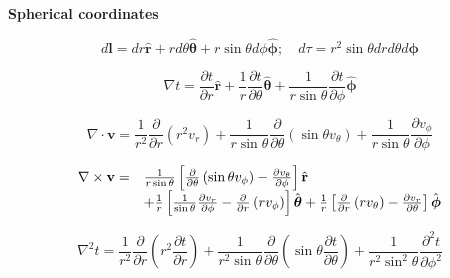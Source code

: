 {\bf Spherical coordinates}

\[
d \mathbf { l } = d r \hat { \mathbf { r } } + r d \theta \hat { \boldsymbol { \theta } } + r \sin \theta d \phi \hat { \boldsymbol { \phi } } ; \quad d \tau = r ^ { 2 } \sin \theta d r d \theta d \boldsymbol { \phi }
\]


\[
\nabla t = \frac { \partial t } { \partial r } \hat { \mathbf { r } } + \frac { 1 } { r } \frac { \partial t } { \partial \theta } \hat { \boldsymbol { \theta } } + \frac { 1 } { r \sin \theta } \frac { \partial t } { \partial \phi } \hat { \boldsymbol { \phi } }
\]



\[
\nabla \cdot \mathbf { v } = \frac { 1 } { r ^ { 2 } } \frac { \partial } { \partial r } \left( r ^ { 2 } v _ { r } \right) + \frac { 1 } { r \sin \theta } \frac { \partial } { \partial \theta } \left( \sin \theta v _ { \theta } \right) + \frac { 1 } { r \sin \theta } \frac { \partial v _ { \phi } } { \partial \phi }
\]


\[
\begin{array} { r l } { \nabla \times \mathbf { v } = } & { \frac { 1 } { r \sin \theta } \left[ \frac { \partial } { \partial \theta } \left( \sin \theta v _ { \phi } \right) - \frac { \partial v _ { \theta } } { \partial \phi } \right] \hat { \mathbf { r } } } \\ { } & { + \frac { 1 } { r } \left[ \frac { 1 } { \sin \theta } \frac { \partial v _ { r } } { \partial \phi } - \frac { \partial } { \partial r } \left( r v _ { \phi } \right) \right] \hat { \boldsymbol { \theta } } + \frac { 1 } { r } \left[ \frac { \partial } { \partial r } \left( r v _ { \theta } \right) - \frac { \partial v _ { r } } { \partial \theta } \right] \hat { \boldsymbol { \phi } } } \end{array}
\]


\[
\nabla ^ { 2 } t = \frac { 1 } { r ^ { 2 } } \frac { \partial } { \partial r } \left( r ^ { 2 } \frac { \partial t } { \partial r } \right) + \frac { 1 } { r ^ { 2 } \sin \theta } \frac { \partial } { \partial \theta } \left( \sin \theta \frac { \partial t } { \partial \theta } \right) + \frac { 1 } { r ^ { 2 } \sin ^ { 2 } \theta } \frac { \partial ^ { 2 } t } { \partial \phi ^ { 2 } }
\]


